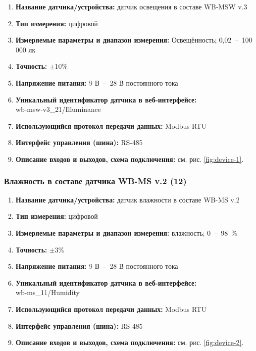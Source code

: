 \documentclass[a4paper,14pt]{extarticle}
\begin{document}
\begin{enumerate}
	\item \textbf{Название датчика/устройства:} датчик освещения в составе WB-MSW v.3
	
	\item \textbf{Тип измерения:} цифровой
	
	\item  \textbf{Измеряемые параметры и диапазон измерения:} Освещённость; 0,02~--~100 000 лк
	
	\item  \textbf{Точность:} $\pm10 \%$	
	\item  \textbf{Напряжение питания:} 9 В~--~28 В постоянного тока
	
	\item  \textbf{Уникальный идентификатор датчика в веб-интерфейсе:} \\wb-msw-v3\_21/Illuminance
	
	\item  \textbf{Использующийся протокол передачи данных:} Modbus RTU
	
	\item  \textbf{Интерфейс управления (шина):} RS-485
	
	\item  \textbf{Описание входов и выходов, схема подключения:} см. рис. \ref{fig:device-1}.
\end{enumerate}


\subsubsection*{Влажность в составе датчика WB-MS v.2 (12)}
\begin{enumerate}
	\item \textbf{Название датчика/устройства:} датчик влажности в составе WB-MS v.2
	
	\item \textbf{Тип измерения:} цифровой
	
	\item  \textbf{Измеряемые параметры и диапазон измерения:} влажность; 0~–~98~\%
	
	\item  \textbf{Точность:} $\pm3 \%$	
	\item  \textbf{Напряжение питания:} 9 В~--~28 В постоянного тока
	
	\item  \textbf{Уникальный идентификатор датчика в веб-интерфейсе:} \\wb-ms\_11/Humidity
	
	\item  \textbf{Использующийся протокол передачи данных:} Modbus RTU
	
	\item  \textbf{Интерфейс управления (шина):} RS-485
	
	\item  \textbf{Описание входов и выходов, схема подключения:} см. рис. \ref{fig:device-2}.
	
\end{enumerate}
\end{document}
